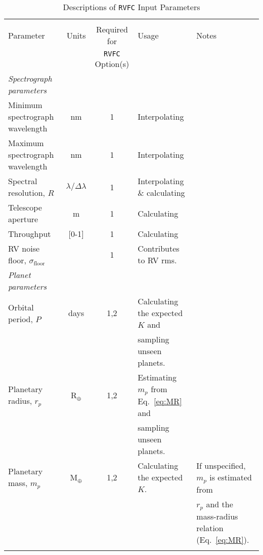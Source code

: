 \clearpage
\begin{landscape}
\begin{table*}
  \small
  \renewcommand{\arraystretch}{0.7}
  \caption{Descriptions of \texttt{RVFC} Input Parameters}
  \label{RVFCtable:rvfc}
  \begin{tabular}{lccll}
    \hline \\ [-1ex]
    Parameter & Units & Required for & Usage & Notes \\
    & & \texttt{RVFC} Option(s) & & \\
    \hline
    \emph{Spectrograph parameters} & & & \\
    Minimum spectrograph wavelength & nm & 1 & Interpolating \sigRV{.} & \\
    Maximum spectrograph wavelength & nm & 1 & Interpolating \sigRV{.} & \\
    Spectral resolution, $R$ & $\lambda / \Delta \lambda$ & 1 & Interpolating \& calculating \sigRV{.} & \\
    Telescope aperture & m & 1 & Calculating \sigRV{.} & \\
    Throughput & [0-1] & 1 & Calculating \sigRV{.} & \\
    RV noise floor, $\sigma_{\text{floor}}$ & \mps{} & 1 & Contributes to RV rms. & \\
    \hline \smallskip

    \emph{Planet parameters} & & & \\
    Orbital period, $P$ & days & 1,2 & Calculating the expected $K$ and & \\ & & & sampling unseen planets. & \\
    Planetary radius, $r_p$ & R$_{\oplus}$ & 1,2 & Estimating $m_p$ from Eq.~\ref{eq:MR} and & \\ &&& sampling unseen planets. & \\ 
    Planetary mass, $m_p$ & M$_{\oplus}$ & 1,2 & Calculating the expected $K$. & If unspecified, $m_p$ is estimated from \\ &&&& $r_p$ and the mass-radius relation (Eq.~\ref{eq:MR}). \\
    \hline \smallskip


\end{tabular}
\end{table*}
\end{landscape}
